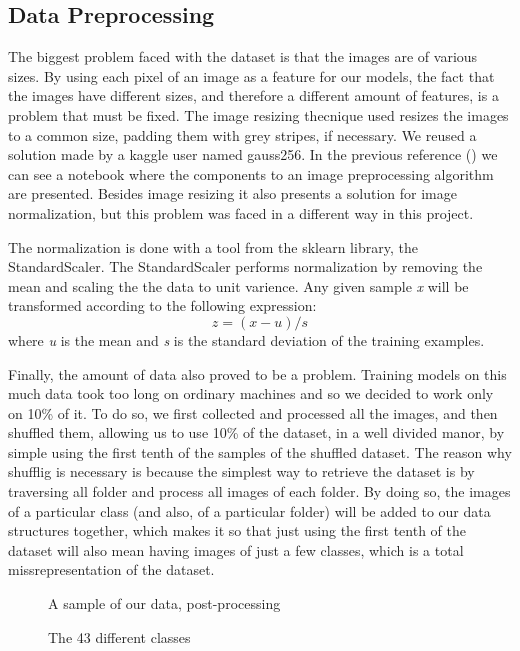 \documentclass[12pt]{article}
\begin{document}
\subsection{Data Preprocessing}
\label{subsection.data_preprocessing}
    \par
        The biggest problem faced with the dataset is that the images are of various sizes. By using each pixel of an image as a feature for our 
        models, the fact that the images have different sizes, and therefore a different amount of features, is a problem that must be fixed. The 
        image resizing thecnique used resizes the images to a common size, padding them with grey stripes, if necessary. We reused a 
        solution made by a kaggle user named gauss256\cite{data_preprocessing}. In the previous reference (\cite{data_preprocessing}) we can see a 
        notebook where the components to an image preprocessing algorithm are presented. Besides image resizing it also presents a solution for image 
        normalization, but this problem was faced in a different way in this project.
    \par
        The normalization is done with a tool from the sklearn library, the StandardScaler. The StandardScaler performs normalization 
        by removing the mean and scaling the the data to unit varience\cite{standardScaler}. Any given sample \textit{x} will be transformed according to  
        the following expression: \[z = (x-u)/s\] where \textit{u} is the mean and \textit{s} is the standard deviation of the training examples.
    \par
        Finally, the amount of data also proved to be a problem. Training models on this much data took too long on ordinary machines and so we decided 
        to work only on 10\% of it. To do so, we first collected and processed all the images, and then shuffled them, allowing us to use 10\% of the dataset, 
        in a well divided manor, by simple using the first tenth of the samples of the shuffled dataset. The reason why shufflig is necessary is because 
        the simplest way to retrieve the dataset is by traversing all folder and process all images of each folder. By doing so, the images of a particular 
        class (and also, of a particular folder) will be added to our data structures together, which makes it so that just using the first tenth of the dataset 
        will also mean having images of just a few classes, which is a total missrepresentation of the dataset.

    \begin{figure}[htb]
        \caption{A sample of our data, post-processing}
    \end{figure}
    \begin{figure}[htb]
        \caption{The 43 different classes}
    \end{figure}
\end{document}
